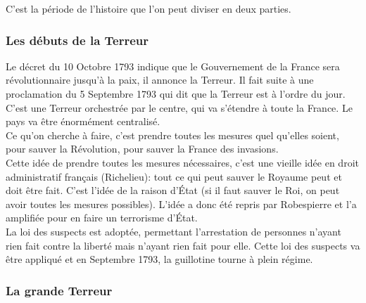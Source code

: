 \documentclass[10pt, a4paper, openany]{book}
\begin{document}
C'est la période de l'histoire que l'on peut diviser en deux parties.

\subsubsection{Les débuts de la Terreur}

Le décret du 10 Octobre 1793 indique que le Gouvernement de la France sera révolutionnaire jusqu'à la paix, il annonce la Terreur. Il fait suite à une proclamation du 5 Septembre 1793 qui dit que la Terreur est à l'ordre du jour. C'est une Terreur orchestrée par le centre, qui va s'étendre à toute la France. Le pays va être énormément centralisé. \\
Ce qu'on cherche à faire, c'est prendre toutes les mesures quel qu'elles soient, pour sauver la Révolution, pour sauver la France des invasions. \\
Cette idée de prendre toutes les mesures nécessaires, c'est une vieille idée en droit administratif français (Richelieu): tout ce qui peut sauver le Royaume peut et doit être fait. C'est l'idée de la raison d'État (si il faut sauver le Roi, on peut avoir toutes les mesures possibles). L'idée a donc été repris par Robespierre et l'a amplifiée pour en faire un terrorisme d'État. \\
La loi des suspects est adoptée, permettant l'arrestation de personnes n'ayant rien fait contre la liberté mais n'ayant rien fait pour elle. Cette loi des suspects va être appliqué et en Septembre 1793, la guillotine tourne à plein régime. 

\subsubsection{La grande Terreur}
\end{document}
